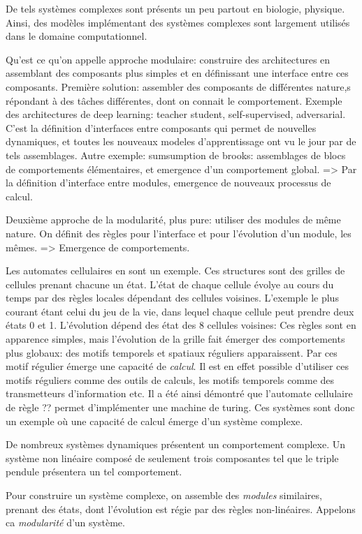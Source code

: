De tels systèmes complexes sont présents un peu partout en biologie, physique.
Ainsi, des modèles implémentant des systèmes complexes sont largement utilisés dans le domaine computationnel. 

Qu'est ce qu'on appelle approche modulaire: construire des architectures en assemblant des composants plus simples et en définissant une interface entre ces composants.
Première solution: assembler des composants de différentes nature,s répondant à des tâches différentes, dont on connait le comportement. Exemple des architectures de deep learning: teacher student, self-supervised, adversarial.
C'est la définition d'interfaces entre composants qui permet de nouvelles dynamiques, et toutes les nouveaux modeles d'apprentissage ont vu le jour par de tels assemblages.
Autre exemple: sumsumption de brooks: assemblages de blocs de comportements élémentaires, et emergence d'un comportement global.
=> Par la définition d'interface entre modules, emergence de nouveaux processus de calcul.


Deuxième approche de la modularité, plus pure: utiliser des modules de même nature. On définit des règles pour l'interface et pour l'évolution d'un module, les mêmes. => Emergence de comportements. 


Les automates cellulaires en sont un exemple. Ces structures sont des grilles de cellules prenant chacune un état. L'état de chaque cellule évolye au cours du temps par des règles locales dépendant des cellules voisines. L'exemple le plus courant étant celui du jeu de la vie, dans lequel chaque cellule peut prendre deux états 0 et 1. L'évolution dépend des état des 8 cellules voisines:
Ces règles sont en apparence simples, mais l'évolution de la grille fait émerger des comportements plus globaux: des motifs temporels et spatiaux réguliers apparaissent. Par ces motif régulier émerge une capacité de \emph{calcul}. Il est en effet possible d'utiliser ces motifs réguliers comme des outils de calculs, les motifs temporels comme des transmetteurs d'information etc. Il a été ainsi démontré que l'automate cellulaire de règle ?? permet d'implémenter une machine de turing. Ces systèmes sont donc un exemple où une capacité de calcul émerge d'un système complexe.

De nombreux systèmes dynamiques présentent un comportement complexe. Un système non linéaire composé de seulement trois composantes tel que le triple pendule présentera un tel comportement. 

Pour construire un système complexe, on assemble des \emph{modules} similaires, prenant des états, dont l'évolution est régie par des règles non-linéaires. Appelons ca \emph{modularité} d'un système. 


